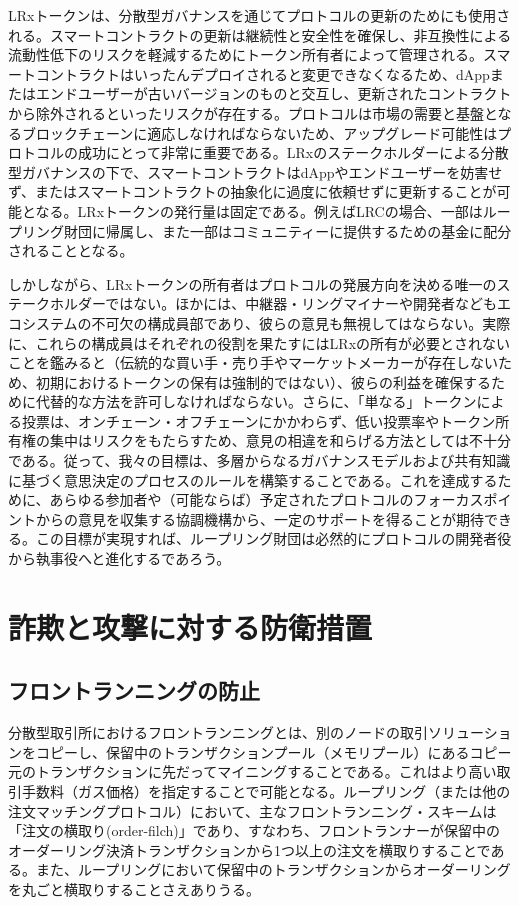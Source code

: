 \documentclass{article}
\begin{document}
\begin{multicols}{2}
LRxトークンは、分散型ガバナンスを通じてプロトコルの更新のためにも使用される。スマートコントラクトの更新は継続性と安全性を確保し、非互換性による流動性低下のリスクを軽減するためにトークン所有者によって管理される。スマートコントラクトはいったんデプロイされると変更できなくなるため、dAppまたはエンドユーザーが古いバージョンのものと交互し、更新されたコントラクトから除外されるといったリスクが存在する。プロトコルは市場の需要と基盤となるブロックチェーンに適応しなければならないため、アップグレード可能性はプロトコルの成功にとって非常に重要である。LRxのステークホルダーによる分散型ガバナンスの下で、スマートコントラクトはdAppやエンドユーザーを妨害せず、またはスマートコントラクトの抽象化に過度に依頼せずに更新することが可能となる。LRxトークンの発行量は固定である。例えばLRCの場合、一部はループリング財団に帰属し、また一部はコミュニティーに提供するための基金に配分されることとなる。

しかしながら、LRxトークンの所有者はプロトコルの発展方向を決める唯一のステークホルダーではない。ほかには、中継器・リングマイナーや開発者などもエコシステムの不可欠の構成員部であり、彼らの意見も無視してはならない。実際に、これらの構成員はそれぞれの役割を果たすにはLRxの所有が必要とされないことを鑑みると（伝統的な買い手・売り手やマーケットメーカーが存在しないため、初期におけるトークンの保有は強制的ではない）、彼らの利益を確保するために代替的な方法を許可しなければならない。さらに、「単なる」トークンによる投票は、オンチェーン・オフチェーンにかかわらず、低い投票率やトークン所有権の集中はリスクをもたらすため、意見の相違を和らげる方法としては不十分である。従って、我々の目標は、多層からなるガバナンスモデルおよび共有知識に基づく意思決定のプロセスのルールを構築することである。これを達成するために、あらゆる参加者や（可能ならば）予定されたプロトコルのフォーカスポイントからの意見を収集する協調機構から、一定のサポートを得ることが期待できる。この目標が実現すれば、ループリング財団は必然的にプロトコルの開発者役から執事役へと進化するであろう。


\section{詐欺と攻撃に対する防衛措置}

\subsection{フロントランニングの防止\label{sec:dual_authoring}}

分散型取引所におけるフロントランニングとは、別のノードの取引ソリューションをコピーし、保留中のトランザクションプール（メモリプール）にあるコピー元のトランザクションに先だってマイニングすることである。これはより高い取引手数料（ガス価格）を指定することで可能となる。ループリング（または他の注文マッチングプロトコル）において、主なフロントランニング・スキームは「注文の横取り(order-filch)」であり、すなわち、フロントランナーが保留中のオーダーリング決済トランザクションから1つ以上の注文を横取りすることである。また、ループリングにおいて保留中のトランザクションからオーダーリングを丸ごと横取りすることさえありうる。


\end{multicols}
\end{document}
